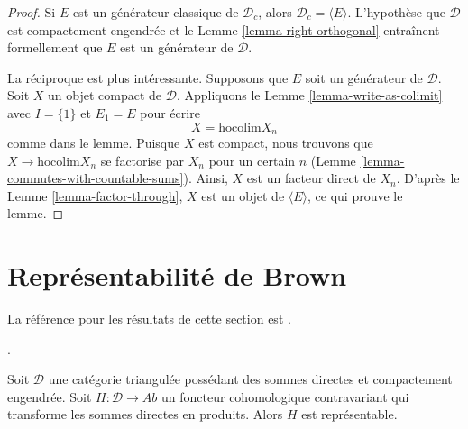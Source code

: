 \begin{proof}
Si $E$ est un générateur classique de $\mathcal{D}_c$, alors
$\mathcal{D}_c = \langle E \rangle$. L'hypothèse que $\mathcal{D}$ est
compactement engendrée et le Lemme \ref{lemma-right-orthogonal} entraînent
formellement que $E$ est un générateur de $\mathcal{D}$.

\medskip\noindent
La réciproque est plus intéressante. Supposons que $E$ soit un générateur de
$\mathcal{D}$. Soit $X$ un objet compact de $\mathcal{D}$.
Appliquons le Lemme \ref{lemma-write-as-colimit} avec $I = \{1\}$ et
$E_1 = E$ pour écrire
$$
X = \text{hocolim} X_n
$$
comme dans le lemme. Puisque $X$ est compact, nous trouvons que
$X \to \text{hocolim} X_n$ se factorise par $X_n$ pour un certain $n$
(Lemme \ref{lemma-commutes-with-countable-sums}).
Ainsi, $X$ est un facteur direct de $X_n$.
D'après le Lemme \ref{lemma-factor-through}, $X$ est un objet de
$\langle E \rangle$, ce qui prouve le lemme.
\end{proof}

\section{Représentabilité de Brown}
\label{section-brown}

\noindent
La référence pour les résultats de cette section est
\cite{Neeman-Grothendieck}.

\begin{lemma}
\label{lemma-brown}
\begin{reference}
\cite[Theorem 3.1]{Neeman-Grothendieck}.
\end{reference}
Soit $\mathcal{D}$ une catégorie triangulée possédant des sommes directes et
compactement engendrée. Soit $H : \mathcal{D} \to \textit{Ab}$ un foncteur
cohomologique contravariant qui transforme les sommes directes en produits.
Alors $H$ est représentable.
\end{lemma}

